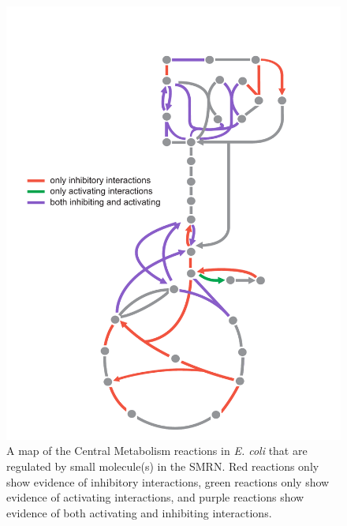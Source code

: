 \documentclass[12pt,a4paper]{article}
\begin{document}
\begin{figure}[ht!]
	\includegraphics[width=\textwidth]{../manuscript/figS8.pdf}
	\caption{A map of the Central Metabolism reactions in \emph{E. coli} that are regulated by small molecule(s) in the SMRN. Red reactions only show evidence of inhibitory interactions, green reactions only show evidence of activating interactions, and purple reactions show evidence of both activating and inhibiting interactions.
	}
\end{figure}
\end{document}
